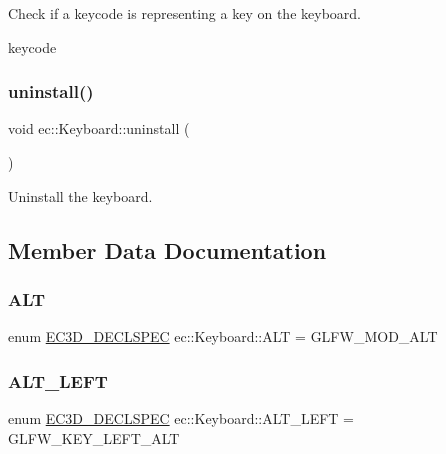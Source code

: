 Check if a keycode is representing a key on the keyboard. 

keycode \mbox{\label{classec_1_1_keyboard_a1e60401ed958ec3d94a77b1dda9f44e8}} 
\subsubsection{\texorpdfstring{uninstall()}{uninstall()}}
{\footnotesize\ttfamily void ec\+::\+Keyboard\+::uninstall (\begin{DoxyParamCaption}{ }\end{DoxyParamCaption})}



Uninstall the keyboard. 



\subsection{Member Data Documentation}
\mbox{\label{classec_1_1_keyboard_a36ca4a76bfbdb9d9e30cace019cec930}} 
\subsubsection{\texorpdfstring{A\+LT}{ALT}}
{\footnotesize\ttfamily enum \mbox{\hyperlink{_common_8h_aac42573e202ca3dd4d259c81691e2369}{E\+C3\+D\+\_\+\+D\+E\+C\+L\+S\+P\+EC}} ec\+::\+Keyboard\+::\+A\+LT = G\+L\+F\+W\+\_\+\+M\+O\+D\+\_\+\+A\+LT}

\mbox{\label{classec_1_1_keyboard_a7f31c587defdb90f3185c6e74396619b}} 
\subsubsection{\texorpdfstring{A\+L\+T\+\_\+\+L\+E\+FT}{ALT\_LEFT}}
{\footnotesize\ttfamily enum \mbox{\hyperlink{_common_8h_aac42573e202ca3dd4d259c81691e2369}{E\+C3\+D\+\_\+\+D\+E\+C\+L\+S\+P\+EC}} ec\+::\+Keyboard\+::\+A\+L\+T\+\_\+\+L\+E\+FT = G\+L\+F\+W\+\_\+\+K\+E\+Y\+\_\+\+L\+E\+F\+T\+\_\+\+A\+LT}

